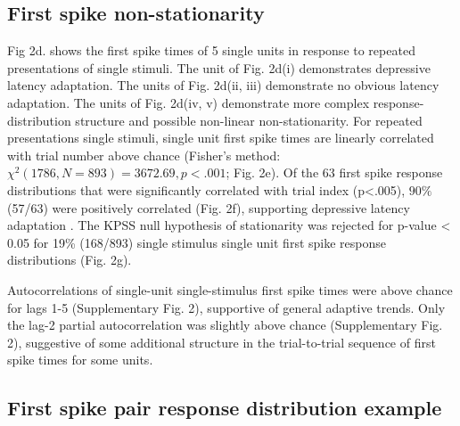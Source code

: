 \documentclass{article}
\begin{document}
 


\subsection*{First spike non-stationarity}

Fig 2d. shows the first spike times of 5 single units in response to repeated presentations of single stimuli. The unit of Fig. 2d(i) demonstrates depressive latency adaptation. The units of Fig. 2d(ii, iii) demonstrate no obvious latency adaptation. The units of Fig. 2d(iv, v) demonstrate more complex response-distribution structure and possible non-linear non-stationarity. For repeated presentations single stimuli, single unit first spike times are linearly correlated with trial number above chance 
(Fisher's method: $\chi^{2} (1786, N = 893) = 3672.69, p<.001$; Fig. 2e).
Of the 63 first spike response distributions that were significantly correlated with trial index (p<.005), $90\%$ (57/63) were positively correlated (Fig. 2f), supporting depressive latency adaptation \cite{ahissar2000transformation, ahissar2001temporal, kheradpezhouh2017response}. The KPSS null hypothesis of stationarity was rejected for p-value < 0.05 for 19\% (168/893) single stimulus single unit first spike response distributions (Fig. 2g). 

Autocorrelations of single-unit single-stimulus first spike times were above chance for lags 1-5 (Supplementary Fig. 2), supportive of general adaptive trends. Only the lag-2 partial autocorrelation was slightly above chance (Supplementary Fig. 2), suggestive of some additional structure in the trial-to-trial sequence of first spike times for some units.


\subsection*{First spike pair response distribution example}
\end{document}
